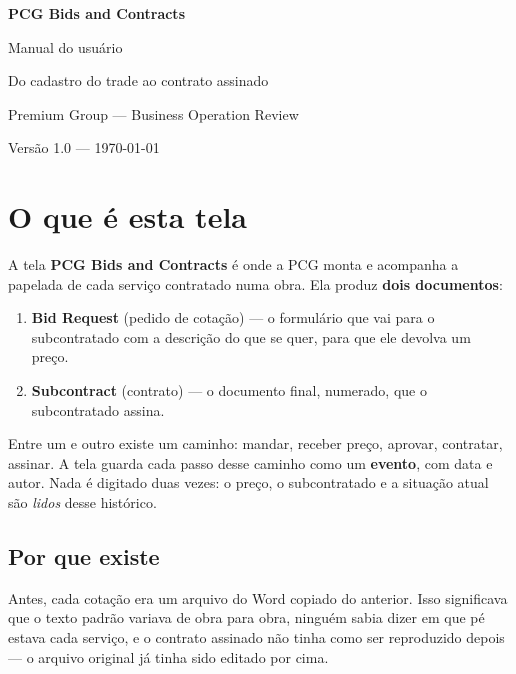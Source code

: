 \documentclass[11pt,a4paper]{article}
\newcommand{\ui}[1]{\textbf{\textsf{#1}}}
\begin{document}
\begin{titlepage}
\centering
\vspace*{3cm}
{\Huge\bfseries\color{pcgblue} PCG Bids and Contracts\par}
\vspace{0.8cm}
{\LARGE Manual do usuário\par}
\vspace{0.4cm}
{\large Do cadastro do trade ao contrato assinado\par}
\vfill
{\large Premium Group — Business Operation Review\par}
{\color{pcggray} Versão 1.0 — \today\par}
\end{titlepage}

\tableofcontents
\newpage

\section{O que é esta tela}

A tela \ui{PCG Bids and Contracts} é onde a PCG monta e acompanha a papelada de
cada serviço contratado numa obra. Ela produz \textbf{dois documentos}:

\begin{enumerate}
  \item \textbf{Bid Request} (pedido de cotação) — o formulário que vai para o
  subcontratado com a descrição do que se quer, para que ele devolva um preço.
  \item \textbf{Subcontract} (contrato) — o documento final, numerado, que o
  subcontratado assina.
\end{enumerate}

Entre um e outro existe um caminho: mandar, receber preço, aprovar, contratar,
assinar. A tela guarda cada passo desse caminho como um \textbf{evento}, com
data e autor. Nada é digitado duas vezes: o preço, o subcontratado e a situação
atual são \emph{lidos} desse histórico.

\subsection{Por que existe}

Antes, cada cotação era um arquivo do Word copiado do anterior. Isso significava
que o texto padrão variava de obra para obra, ninguém sabia dizer em que pé
estava cada serviço, e o contrato assinado não tinha como ser reproduzido depois
— o arquivo original já tinha sido editado por cima.
\end{document}
